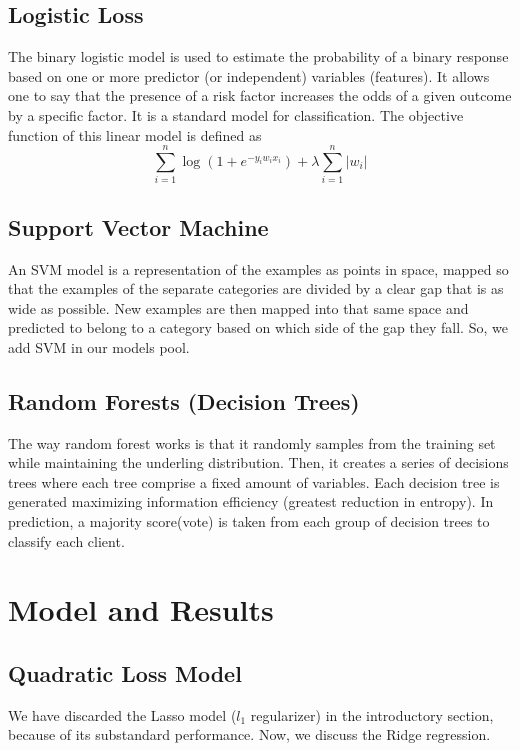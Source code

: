 \documentclass{mytemplate}%
\begin{document}
\begin{multicols}{2}
\subsection{Logistic Loss}
The binary logistic model is used to estimate the probability of a binary response based on one or more predictor (or independent) variables (features). It allows one to say that the presence of a risk factor increases the odds of a given outcome by a specific factor. It is a standard model for classification. The objective function of this linear model is defined as
\begin{equation}\label{eq03}
  \sum_{i=1}^n\log(1+e^{-y_iw_ix_i})+\lambda\sum_{i=1}^n|w_i|
\end{equation}

\subsection{Support Vector Machine}
An SVM model is a representation of the examples as points in space, mapped so that the examples of the separate categories are divided by a clear gap that is as wide as possible. New examples are then mapped into that same space and predicted to belong to a category based on which side of the gap they fall. So, we add SVM in our models pool.




\subsection{Random Forests (Decision Trees)}
The way random forest works is that it randomly samples from the training set while maintaining the underling distribution. Then, it creates a series of decisions trees where each tree comprise a fixed amount of variables. Each decision tree is generated maximizing information efficiency (greatest reduction in entropy). In prediction, a majority score(vote) is taken from each group of decision trees to classify each client.




\section{\color{blue}Model and Results}
\subsection{Quadratic Loss Model}
We have discarded the Lasso model ($l_1$ regularizer) in the introductory section, because of its substandard performance. Now, we discuss the Ridge regression.

\end{multicols}
\end{document}
